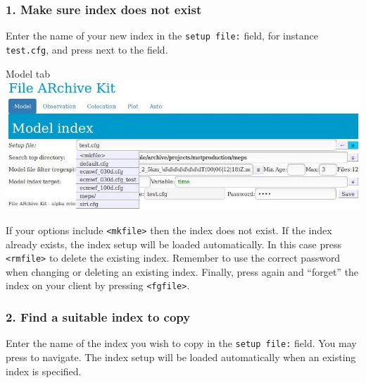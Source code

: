 \documentclass[letterpaper,10pt,twoside,twocolumn,openany]{book}
\begin{document}
\subsubsection{1. Make sure index does not exist}
Enter the name of your new index in the \lstinline!setup file:! field, for instance \lstinline!test.cfg!,
and press   next to the field.
\begin{paperbox}{Model tab}
  \includegraphics[width=\columnwidth]{how_mod.jpg}
\end{paperbox}
If your options include \lstinline!<mkfile>! then the index does not exist.
If the index already exists, the index setup will be loaded automatically.
In this case press \lstinline!<rmfile>! to delete the existing index.
Remember to use the correct password when changing or deleting an existing index.
Finally, press  again and ``forget'' the index on your client by pressing  \lstinline!<fgfile>!.
\subsubsection{2. Find a suitable index to copy}
Enter the name of the index you wish to copy in the \lstinline!setup file:! field.
You may press  to navigate.
The index setup will be loaded automatically when an existing index is specified.
\end{document}
